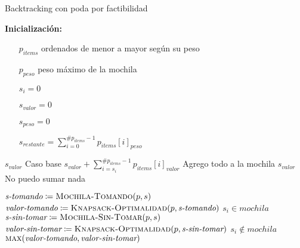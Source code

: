 \documentclass[fleqn, 11pt]{article}
\def\is{\coloneqq}
\begin{document}
\begin{algorithm}
\caption{Backtracking con poda por factibilidad}
\begin{algorithmic}[1]
\item[\textbf{Inicialización:}]
\item[] \begin{itemize}
	\item[] $p_{items}$ ordenados de menor a mayor según su peso
	\item[] $p_{peso}$ peso máximo de la mochila
	\item[] $s_i = 0$
	\item[] $s_{valor} = 0$
	\item[] $s_{peso} = 0$
	\item[] $s_{restante} = \sum_{i = 0}^{\#p_{items} - 1} p_{items}[i]_{peso}$
\end{itemize}
\Statex
{}
	\State \Return $s_{valor}$
	\Comment Caso base
\EndIf
{}
	\State \Return $s_{valor} + \sum_{i=s_i}^{\#p_{items} - 1} p_{items}[i]_{valor}$
	\Comment Agrego todo a la mochila
\EndIf
{}
	\State \Return $s_{valor}$
	\Comment No puedo sumar nada
\EndIf

\State $\textit{s-tomando} \is \Call{Mochila-Tomando}{p, s}$
\State $\textit{valor-tomando} \is \Call{Knapsack-Optimalidad}{p, \textit{s-tomando}}$
\Comment $s_i \in mochila$
\State $\textit{s-sin-tomar} \is \Call{Mochila-Sin-Tomar}{p, s}$
\State $\textit{valor-sin-tomar} \is \Call{Knapsack-Optimalidad}{p, \textit{s-sin-tomar}}$
\Comment $s_i \not\in mochila$
\State \Return $\Call{max}{\textit{valor-tomando}, \textit{valor-sin-tomar}}$
\EndFunction
\end{algorithmic}
\end{algorithm}
\end{document}
